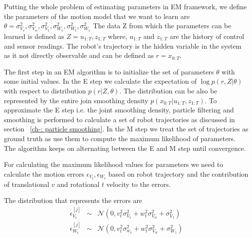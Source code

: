 \documentclass[12pt]{dalcsthesis}
\begin{document}
Putting the whole problem of estimating parameters in EM framework, we define the parameters of the motion model that we want to learn are
$\theta={\sigma_{V_{v}}^{2},\sigma_{V_{w}}^{2},\sigma_{V_{1}}^{2},\sigma_{W_{v}}^{2},\sigma_{W_{t}}^{2},\sigma_{W_{1}}^{2}}$
The data Z from which the parameters can be learned is defined as $Z={u_{1:T},z_{1:T}}$
where, $u_{1:T}$ and $z_{1:T}$ are the history of control and sensor readings. The robot's trajectory is the hidden variable in the system as it not directly observable and can be defined as $r=x_{0:T}$.

The first step in an EM algorithm is to initialize the set of parameters $\theta$ with some initial values. In the E step we calculate the expectation of $\log p(r,Z|\theta)$ with respect to distribution $p(r|Z,\theta)$. The distribution can be also be represented by the entire join smoothing density $p(x_{0:T}|u_{1:T},z_{1:T})$. To approximate the E step i.e. the joint smoothing density, particle filtering and smoothing is performed to calculate a set of robot trajectories as discussed in section ~\ref{ch-: particle smoothing}. In the M step we treat the set of trajectories as ground truth as use them to compute the maximum likelihood of parameters. The algorithm keeps on alternating between the E and M step until convergence. 

For calculating the maximum likelihood values for parameters we need to calculate the motion errors $\epsilon_{V_{t}},\epsilon_{W_{t}}$ based on robot trajectory and the contribution of translational $v$ and rotational $t$ velocity to the errors.

The distribution that represents the errors are 
\begin{eqnarray}
\epsilon_{V_{t}}^{[j]}&\sim&\mathcal{{N}}(0,v_{t}^{2}\sigma_{V_{v}}^{2}+w_{t}^{2}\sigma_{V_{w}}^{2}+\sigma_{V_{1}}^{2})\\
\epsilon_{W_{t}}^{[j]}&\sim&\mathcal{{N}}(0,v_{t}^{2}\sigma_{w_{v}}^{2}+w_{t}^{2}\sigma_{V_{w}}^{2}+\sigma_{W_{1}}^{2})
\end{eqnarray}
\end{document}
